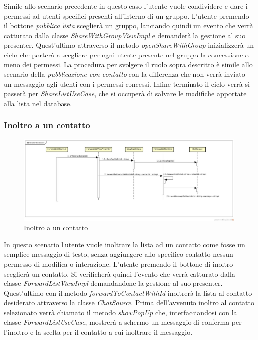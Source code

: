 Simile allo scenario precedente in questo caso l'utente vuole condividere e dare i permessi ad utenti specifici presenti all'interno di un gruppo. L'utente premendo il bottone \textit{pubblica lista} sceglierà un gruppo, lanciando quindi un evento che verrà catturato dalla classe \textit{ShareWithGroupViewImpl} e demanderà la gestione al suo presenter. Quest'ultimo attraverso il metodo \textit{openShareWithGroup} inizializzerà un ciclo che porterà a scegliere per ogni utente presente nel gruppo la concessione o meno dei permessi. La procedura per svolgere il ruolo sopra descritto è simile allo scenario della \textit{pubblicazione con contatto} con la differenza che non verrà inviato un messaggio agli utenti con i permessi concessi. Infine terminato il ciclo verrà si passerà per \textit{ShareListUseCase}, che si occuperà di salvare le modifiche apportate alla lista nel database.

\subsubsection{Inoltro a un contatto}

\label{Inoltro a un contatto}
\begin{figure}[H]
	\centering
	\includegraphics[width=\textwidth]{Sezioni/Diagrammi/App/forward_contatto.jpg}
	\caption{Inoltro a un contatto}
	
\end{figure}

In questo scenario l'utente vuole inoltrare la lista ad un contatto come fosse un semplice messaggio di testo, senza aggiungere allo specifico contatto nessun permesso di modifica o interazione. L'utente premendo il bottone di inoltro sceglierà un contatto. Si verificherà quindi l'evento che verrà catturato dalla classe \textit{ForwardListViewImpl} demandandone la gestione al suo presenter.
Quest'ultimo con il metodo \textit{forwardToContactWithId} inoltrerà la lista al contatto desiderato attraverso la classe \textit{ChatSource}. Prima dell'avvenuto inoltro al contatto selezionato verrà chiamato il metodo \textit{showPopUp} che, interfacciandosi con la classe \textit{ForwardListUseCase}, mostrerà a schermo un messaggio di conferma per l'inoltro e la scelta per il contatto a cui inoltrare il messaggio.



